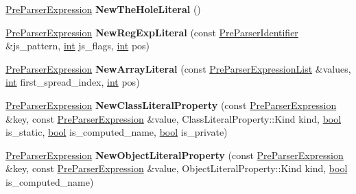 \begin{DoxyCompactItemize}
\item 
\mbox{\label{classv8_1_1internal_1_1PreParserFactory_acdf75edae09266db9ae7f346c528beda}} 
\mbox{\hyperlink{classv8_1_1internal_1_1PreParserExpression}{Pre\+Parser\+Expression}} {\bfseries New\+The\+Hole\+Literal} ()
\item 
\mbox{\label{classv8_1_1internal_1_1PreParserFactory_a6fccfaa1fc0b50b813db3e96a2cd71b3}} 
\mbox{\hyperlink{classv8_1_1internal_1_1PreParserExpression}{Pre\+Parser\+Expression}} {\bfseries New\+Reg\+Exp\+Literal} (const \mbox{\hyperlink{classv8_1_1internal_1_1PreParserIdentifier}{Pre\+Parser\+Identifier}} \&js\+\_\+pattern, \mbox{\hyperlink{classint}{int}} js\+\_\+flags, \mbox{\hyperlink{classint}{int}} pos)
\item 
\mbox{\label{classv8_1_1internal_1_1PreParserFactory_af89441c75f706a6725035d0c402c9836}} 
\mbox{\hyperlink{classv8_1_1internal_1_1PreParserExpression}{Pre\+Parser\+Expression}} {\bfseries New\+Array\+Literal} (const \mbox{\hyperlink{classv8_1_1internal_1_1PreParserExpressionList}{Pre\+Parser\+Expression\+List}} \&values, \mbox{\hyperlink{classint}{int}} first\+\_\+spread\+\_\+index, \mbox{\hyperlink{classint}{int}} pos)
\item 
\mbox{\label{classv8_1_1internal_1_1PreParserFactory_aef1bbb7140e59d70d88ce4d698cc637a}} 
\mbox{\hyperlink{classv8_1_1internal_1_1PreParserExpression}{Pre\+Parser\+Expression}} {\bfseries New\+Class\+Literal\+Property} (const \mbox{\hyperlink{classv8_1_1internal_1_1PreParserExpression}{Pre\+Parser\+Expression}} \&key, const \mbox{\hyperlink{classv8_1_1internal_1_1PreParserExpression}{Pre\+Parser\+Expression}} \&value, Class\+Literal\+Property\+::\+Kind kind, \mbox{\hyperlink{classbool}{bool}} is\+\_\+static, \mbox{\hyperlink{classbool}{bool}} is\+\_\+computed\+\_\+name, \mbox{\hyperlink{classbool}{bool}} is\+\_\+private)
\item 
\mbox{\label{classv8_1_1internal_1_1PreParserFactory_a70b4e0701018372d513b5ab04f3b2801}} 
\mbox{\hyperlink{classv8_1_1internal_1_1PreParserExpression}{Pre\+Parser\+Expression}} {\bfseries New\+Object\+Literal\+Property} (const \mbox{\hyperlink{classv8_1_1internal_1_1PreParserExpression}{Pre\+Parser\+Expression}} \&key, const \mbox{\hyperlink{classv8_1_1internal_1_1PreParserExpression}{Pre\+Parser\+Expression}} \&value, Object\+Literal\+Property\+::\+Kind kind, \mbox{\hyperlink{classbool}{bool}} is\+\_\+computed\+\_\+name)

\end{DoxyCompactItemize}
